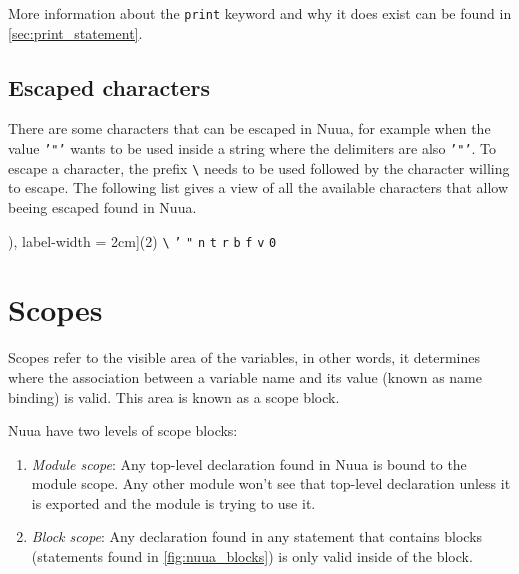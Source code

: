 More information about the \texttt{print} keyword and why it does exist can be found in \autoref{sec:print_statement}.

\subsection{Escaped characters}
\label{sec:espaced_chars}

There are some characters that can be escaped in Nuua, for example when the value \texttt{'"'} wants to be used inside
a string where the delimiters are also \texttt{'"'}. To escape a character, the prefix \texttt{\textbackslash} needs to be used followed
by the character willing to escape. The following list gives a view of all the available characters that allow beeing escaped found in Nuua.\\

\begin{tasks}[counter-format = (tsk[r]), label-width = 2cm](2)
        \task \texttt{\textbackslash}
        \task \texttt{'}
        \task \texttt{"}
        \task \texttt{n}
        \task \texttt{t}
        \task \texttt{r}
        \task \texttt{b}
        \task \texttt{f}
        \task \texttt{v}
        \task \texttt{0}\\
\end{tasks}

\section{Scopes}
\label{sec:nuua_scopes}

Scopes refer to the visible area of the variables, in other words, it determines where the association between a variable name
and its value (known as name binding) is valid. This area is known as a scope block.

Nuua have two levels of scope blocks:

\begin{enumerate}
    \item \emph{Module scope}: Any top-level declaration found in Nuua is bound to the module scope. Any other module won't see that
        top-level declaration unless it is exported and the module is trying to use it.
    \item \emph{Block scope}: Any declaration found in any statement that contains blocks (statements found in \autoref{fig:nuua_blocks})
        is only valid inside of the block.
\end{enumerate}

